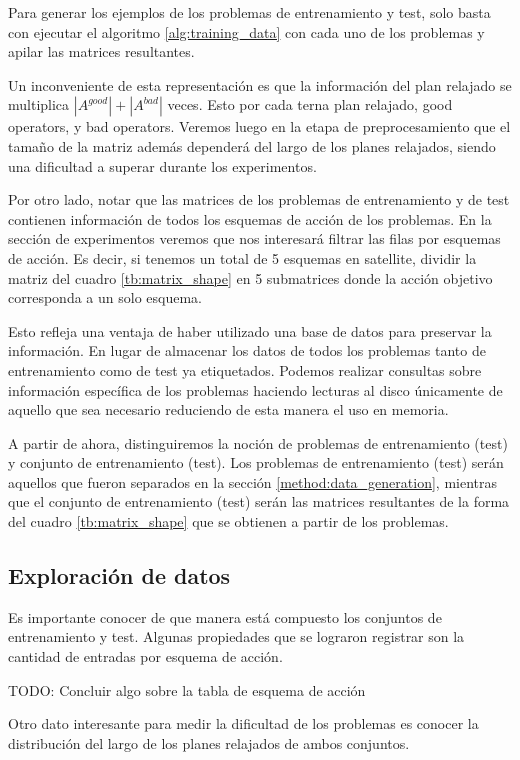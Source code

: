 Para generar los ejemplos de los problemas de entrenamiento y test, solo basta con ejecutar el algoritmo \ref{alg:training_data} con cada uno de los problemas y apilar las matrices resultantes.

Un inconveniente de esta representación es que la información del plan relajado se multiplica $|A^{good}| + |A^{bad}|$ veces. Esto por cada terna plan relajado, good operators, y bad operators.
Veremos luego en la etapa de preprocesamiento que el tamaño de la matriz además dependerá del largo de los planes relajados, siendo una dificultad a superar durante los experimentos.

Por otro lado, notar que las matrices de los problemas de entrenamiento y de test contienen información de todos los esquemas de acción de los problemas. En la sección de experimentos veremos que nos interesará filtrar las filas por esquemas de acción. Es decir, si tenemos un total de 5 esquemas en satellite, dividir la matriz del cuadro \ref{tb:matrix_shape} en 5 submatrices donde la acción objetivo corresponda a un solo esquema.

Esto refleja una ventaja de haber utilizado una base de datos para preservar la información. En lugar de almacenar los datos de todos los problemas tanto de entrenamiento como de test ya etiquetados. Podemos realizar consultas sobre información específica de los problemas haciendo lecturas al disco únicamente de aquello que sea necesario reduciendo de esta manera el uso en memoria.

A partir de ahora, distinguiremos la noción de problemas de entrenamiento (test) y conjunto de entrenamiento (test). Los problemas de entrenamiento (test) serán aquellos que fueron separados en la sección \ref{method:data_generation}, mientras que el conjunto de entrenamiento (test) serán las matrices resultantes de la forma del cuadro \ref{tb:matrix_shape} que se obtienen a partir de los problemas.

\subsection{Exploración de datos}

Es importante conocer de que manera está compuesto los conjuntos de entrenamiento y test. Algunas propiedades que se lograron registrar son la cantidad de entradas por esquema de acción.

TODO: Concluir algo sobre la tabla de esquema de acción

Otro dato interesante para medir la dificultad de los problemas es conocer la distribución del largo de los planes relajados de ambos conjuntos.

